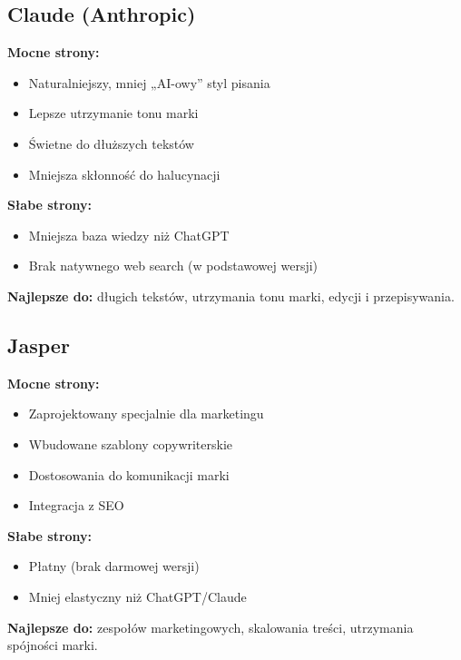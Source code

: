 \documentclass[
  12pt,
  a4paper,
  twoside,
  openright,
  12pt,
  DIV=12,
  BCOR=12mm]{scrbook}
\providecommand{\tightlist}{%
  \setlength{\itemsep}{0pt}\setlength{\parskip}{0pt}}\usepackage{longtable,booktabs,array}
\begin{document}
\subsection{Claude (Anthropic)}\label{claude-anthropic}

\textbf{Mocne strony:}

\begin{itemize}
\tightlist
\item
  Naturalniejszy, mniej „AI-owy'' styl pisania
\item
  Lepsze utrzymanie tonu marki
\item
  Świetne do dłuższych tekstów
\item
  Mniejsza skłonność do halucynacji
\end{itemize}

\textbf{Słabe strony:}

\begin{itemize}
\tightlist
\item
  Mniejsza baza wiedzy niż ChatGPT
\item
  Brak natywnego web search (w podstawowej wersji)
\end{itemize}

\textbf{Najlepsze do:} długich tekstów, utrzymania tonu marki, edycji i
przepisywania.

\subsection{Jasper}\label{jasper}

\textbf{Mocne strony:}

\begin{itemize}
\tightlist
\item
  Zaprojektowany specjalnie dla marketingu
\item
  Wbudowane szablony copywriterskie
\item
  Dostosowania do komunikacji marki
\item
  Integracja z SEO
\end{itemize}

\textbf{Słabe strony:}

\begin{itemize}
\tightlist
\item
  Płatny (brak darmowej wersji)
\item
  Mniej elastyczny niż ChatGPT/Claude
\end{itemize}

\textbf{Najlepsze do:} zespołów marketingowych, skalowania treści,
utrzymania spójności marki.
\end{document}
